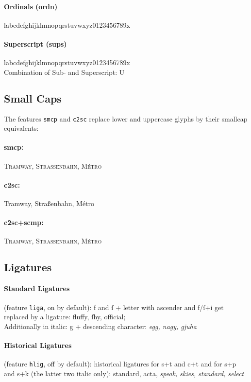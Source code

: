 \documentclass[pagesize,DIV14]{scrartcl}
\begin{document}
\paragraph*{Ordinals (ordn)} l{abcdefghijklmnopqrstuvwxyz0123456789}x
\paragraph*{Superscript (sups)} l{abcdefghijklmnopqrstuvwxyz0123456789}x
\\
\setlength\subsupersep{1pt}
Combination of Sub- and Superscript: U
\subsection{Small Caps}
The features \texttt{smcp} and \texttt{c2sc} replace lower and uppercase glyphs by their smallcap equivalents:
\paragraph*{smcp:} \textsc{Tramway, Straßenbahn, Métro}
\paragraph*{c2sc:} {Tramway, Straßenbahn, Métro}
\paragraph*{c2sc+scmp:} \textsc{Tramway, Straßenbahn, Métro}

\subsection{Ligatures}
\paragraph*{Standard Ligatures} (feature \texttt{liga}, on by default): f and ſ + letter with ascender and f/ſ+i get replaced by a ligature: fluffy, ſhy, official;\\
Additionally in italic: g + descending character: \textit{egg, nagy, gjuha} 
\paragraph*{Historical Ligatures} (feature \texttt{hlig}, off by default): historical ligatures for s+t and c+t and for s+p and s+k (the latter two italic only): {standard, acta, \textit{speak, skies, standard, select}}
\end{document}
